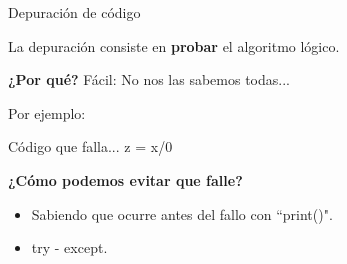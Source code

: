 \begin{frame}[t]{Depuración de código}\vspace{10pt}

La depuración consiste en \textbf{probar} el algoritmo lógico.

\vspace{10pt}

\textbf{¿Por qué?}
Fácil: No nos las sabemos todas...

\vspace{10 pt}
Por ejemplo:
\begin{block}{Código que falla...}
z = x/0
\end{block}

\textbf{¿Cómo podemos evitar que falle?}

\begin{itemize}
	\item Sabiendo que ocurre antes del fallo con ``print()".
	\item try - except.
\end{itemize}

\end{frame}